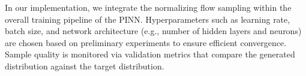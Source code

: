 In our implementation, we integrate the normalizing flow sampling within the overall training pipeline of the PINN. Hyperparameters such as learning rate, batch size, and network architecture (e.g., number of hidden layers and neurons) are chosen based on preliminary experiments to ensure efficient convergence. Sample quality is monitored via validation metrics that compare the generated distribution against the target distribution.
